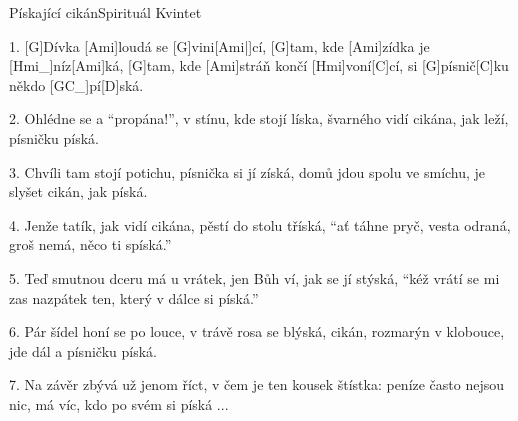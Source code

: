 %
\begin{song}{Pískající cikán}{Spirituál Kvintet}

\begin{xverse}{1. }
[G]Dívka [Ami]loudá se [G]vini[Ami|]{cí,} [G]tam, kde [Ami]zídka je [Hmi_]{níz}[Ami]{ká},
[G]tam, kde [Ami]stráň končí [Hmi]voní[C]cí, si [G]písnič[C]ku někdo [GC_]{pí}[D]{ská}.
\end{xverse}

\begin{xverse}{2. }
Ohlédne se a ``propána!'', v stínu, kde stojí líska,
švarného vidí cikána, jak leží, písničku píská.
\end{xverse}


\begin{xverse}{3. }
Chvíli tam stojí potichu, písnička si jí získá,
domů jdou spolu ve smíchu, je slyšet cikán, jak píská.
\end{xverse}


\begin{xverse}{4. }
Jenže tatík, jak vidí cikána, pěstí do stolu tříská,
``ať táhne pryč, vesta odraná, groš nemá, něco ti spíská.''
\end{xverse}


\begin{xverse}{5. }
Teď smutnou dceru má u vrátek, jen Bůh ví, jak se jí stýská,
``kéž vrátí se mi zas nazpátek ten, který v dálce si píská.''
\end{xverse}


\begin{xverse}{6. }
Pár šídel honí se po louce, v trávě rosa se blýská,
cikán, rozmarýn v klobouce, jde dál a písničku píská.
\end{xverse}


\begin{xverse}{7. }
Na závěr zbývá už jenom říct, v čem je ten kousek štístka:
peníze často nejsou nic, má víc, kdo po svém si píská ...
\end{xverse}

\end{song}


